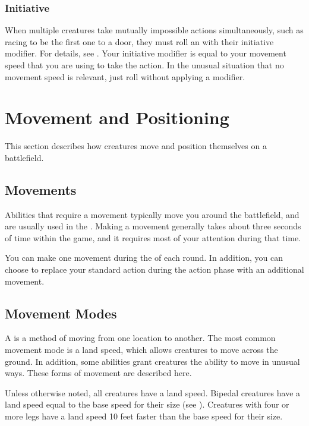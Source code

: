         \subsubsection{Initiative}\label{Initiative}
            When multiple creatures take mutually impossible actions simultaneously, such as racing to be the first one to a door, they must roll an  with their initiative modifier.
            For details, see .
            Your initiative modifier is equal to your movement speed that you are using to take the action.
            In the unusual situation that no movement speed is relevant, just roll without applying a modifier.

\section{Movement and Positioning}\label{Movement and Positioning}
    This section describes how creatures move and position themselves on a battlefield.

    \subsection{Movements}\label{Movements}
        Abilities that require a movement typically move you around the battlefield, and are usually used in the .
        Making a movement generally takes about three seconds of time within the game, and it requires most of your attention during that time.

        You can make one movement during the  of each round.
        In addition, you can choose to replace your standard action during the action phase with an additional movement.

    \subsection{Movement Modes}\label{Movement Modes}
        A  is a method of moving from one location to another.
        The most common movement mode is a land speed, which allows creatures to move across the ground.
        In addition, some abilities grant creatures the ability to move in unusual ways.
        These forms of movement are described here.

        Unless otherwise noted, all creatures have a land speed.
        Bipedal creatures have a land speed equal to the base speed for their size (see ).
        Creatures with four or more legs have a land speed 10 feet faster than the base speed for their size.

